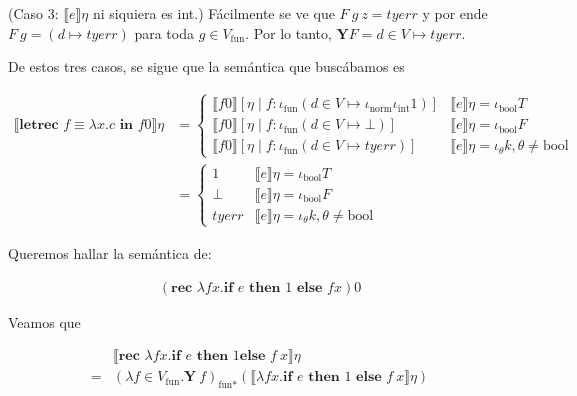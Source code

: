 \documentclass[article, 12pt]{article}
\begin{document}
(Caso 3: $\llbracket e \rrbracket\eta$ ni siquiera es int.) Fácilmente se ve que
$F ~ g ~ z = tyerr$ y por ende $F ~ g = (d \mapsto tyerr)$ para toda $g \in
V_{\text{fun}}$. Por lo tanto, $\textbf{Y} F = d\in V \mapsto tyerr$.

De estos tres casos, se sigue que la semántica que buscábamos es 

\begin{align*}
    \llbracket \textbf{letrec } f \equiv \lambda x.c \textbf{ in } f 0
    \rrbracket\eta 
    &= \begin{cases}
        \llbracket f0 \rrbracket[\eta \mid f : \iota_{\text{fun}} (d \in V \mapsto
        \iota_{\text{norm}} \iota_{\text{int}} 1)] &\llbracket e \rrbracket\eta
        = \iota_{\text{bool}} T\\ 
        \llbracket f 0 \rrbracket[\eta \mid f :\iota_{\text{fun}} (d \in V
        \mapsto \bot ) ] &  \llbracket e \rrbracket\eta = \iota_{\text{bool}} F \\ 
        \llbracket f 0 \rrbracket[\eta \mid f : \iota_{\text{fun}} (d \in V
        \mapsto tyerr)] & \llbracket e \rrbracket\eta = \iota_\theta k, \theta
        \neq \text{bool}
    \end{cases}\\
    &=\begin{cases}
        1 &\llbracket e \rrbracket\eta
        = \iota_{\text{bool}} T\\ 
        \bot  &  \llbracket e \rrbracket\eta = \iota_{\text{bool}} F \\ 
        tyerr & \llbracket e \rrbracket\eta = \iota_\theta k, \theta
        \neq \text{bool}
    \end{cases}
\end{align*}

\pagebreak 

Queremos hallar la semántica de:


\begin{align*}
    (\textbf{rec } \lambda f x.\textbf{if } e \textbf{ then } 1 \textbf{ else }
    f x  ) 0
\end{align*}

Veamos que 

\begin{align*}
    &\llbracket \textbf{rec }\lambda fx.\textbf{if } e \textbf{ then } 1 \textbf{
    else } f ~  x \rrbracket\eta \\
    = &(\lambda f \in V_{\text{fun}}. \textbf{Y} ~
    f)_{\text{fun}*}(\llbracket \lambda fx.\textbf{if } e \textbf{ then } 1 \textbf{ else } f
    ~  x \rrbracket\eta)
\end{align*}
\end{document}
